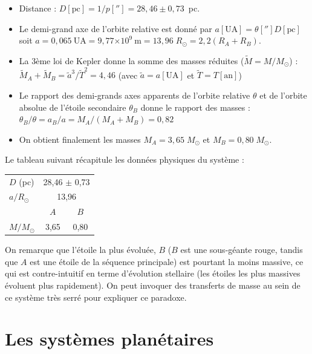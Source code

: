 \documentclass[a4paper,10pt]{report}
\newcommand{\e}[1]{\ensuremath{\times 10^{#1}}}
\renewcommand{\u}[1]{\ensuremath{\mathrm{#1}}} %
\begin{document}
\begin{Answer}
  \begin{itemize}
  \item Distance : $D [\u{pc}] = 1/p[''] = 28,46 \pm 0,73$~pc.
  \item Le demi-grand axe de l'orbite relative est donné par $a
    [\u{UA}] = \theta [''] D [\u{pc}]$ soit $a = 0,065~\u{UA} =
    9,77\e{9}~\u{m} = 13,96\;R_{\odot} = 2,2 (R_{A}+R_{B})$.
  \item La 3ème loi de Kepler donne la somme des masses réduites
    ($\tilde{M} = M/M_{\odot}$) : $\tilde{M}_A + \tilde{M}_B =
    \tilde{a}^3/\tilde{T}^2 = 4,46$ (avec $\tilde{a} = a[\u{UA}]$ et
    $\tilde{T} = T[\u{an}]$)
  \item Le rapport des demi-grands axes apparents de l'orbite relative
    $\theta$ et de l'orbite absolue de l'étoile secondaire $\theta_B$
    donne le rapport des masses : $\theta_B / \theta = a_B / a = M_A /
    (M_A + M_B) = 0,82$
  \item On obtient finalement les masses $M_A = 3,65\;M_{\odot}$ et $M_B =
    0,80\;M_{\odot}$.
  \end{itemize}
  Le tableau suivant récapitule les données physiques du système :
  \begin{center}
    \begin{tabular}{lcc}
      \toprule
      $D$ (pc) & \multicolumn{2}{c}{28,46 $\pm$ 0,73} \\
      $a/R_{\odot}$ & \multicolumn{2}{c}{13,96} \\
      \midrule
      & $A$ & $B$ \\
      \cmidrule(r){2-3}
      $M/M_{\odot}$ & 3,65 & 0,80 \\
      \bottomrule
    \end{tabular}
  \end{center}
  On remarque que l'étoile la plus évoluée, $B$ ($B$ est une
  sous-géante rouge, tandis que $A$ est une étoile de la séquence
  principale) est pourtant la moins massive, ce qui est
  contre-intuitif en terme d'évolution stellaire (les étoiles les plus
  massives évoluent plus rapidement). On peut invoquer des transferts
  de masse au sein de ce système très serré pour expliquer ce
  paradoxe.
\end{Answer}

\section{Les systèmes planétaires}
\end{document}
